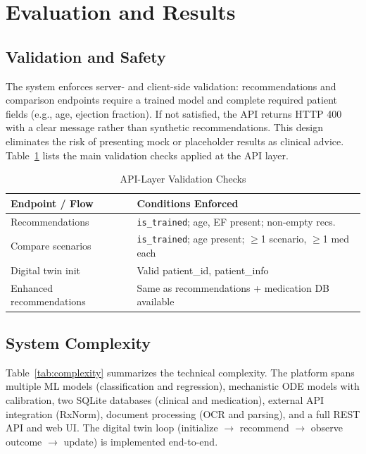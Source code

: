 \documentclass[conference]{IEEEtran}
\begin{document}
\section{Evaluation and Results}

\subsection{Validation and Safety}
The system enforces server- and client-side validation: recommendations and comparison endpoints require a trained model and complete required patient fields (e.g., age, ejection fraction). If not satisfied, the API returns HTTP 400 with a clear message rather than synthetic recommendations. This design eliminates the risk of presenting mock or placeholder results as clinical advice. Table~\ref{tab:validation} lists the main validation checks applied at the API layer.

\begin{table}[t]
\caption{API-Layer Validation Checks}
\label{tab:validation}
\centering
\footnotesize
\begin{tabular}{@{}p{}p{}@{}}
\toprule
\textbf{Endpoint / Flow} & \textbf{Conditions Enforced} \\
\midrule
Recommendations & \texttt{is\_trained}; age, EF present; non-empty recs. \\
Compare scenarios & \texttt{is\_trained}; age present; $\ge$1 scenario, $\ge$1 med each \\
Digital twin init & Valid patient\_id, patient\_info \\
Enhanced recommendations & Same as recommendations + medication DB available \\
\bottomrule
\end{tabular}
\end{table}

\subsection{System Complexity}
Table~\ref{tab:complexity} summarizes the technical complexity. The platform spans multiple ML models (classification and regression), mechanistic ODE models with calibration, two SQLite databases (clinical and medication), external API integration (RxNorm), document processing (OCR and parsing), and a full REST API and web UI. The digital twin loop (initialize $\rightarrow$ recommend $\rightarrow$ observe outcome $\rightarrow$ update) is implemented end-to-end.
\end{document}
